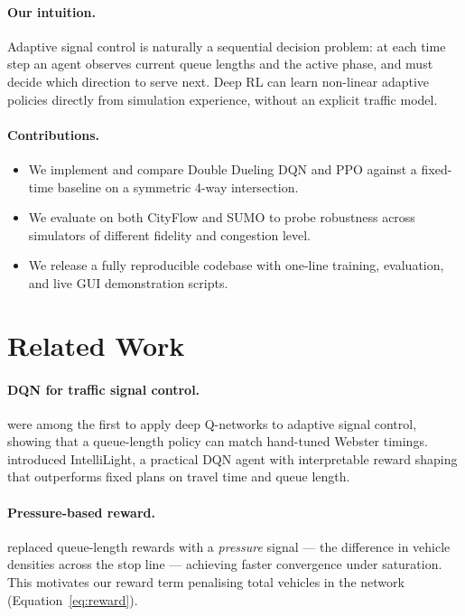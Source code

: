 \documentclass[10pt]{article}
\begin{document}
\paragraph{Our intuition.}
Adaptive signal control is naturally a sequential decision problem: at each
time step an agent observes current queue lengths and the active phase, and
must decide which direction to serve next.  Deep RL can learn non-linear
adaptive policies directly from simulation experience, without an explicit
traffic model.

\paragraph{Contributions.}
\begin{itemize}
  \item We implement and compare Double Dueling DQN and PPO against a
        fixed-time baseline on a symmetric 4-way intersection.
  \item We evaluate on both CityFlow and SUMO to probe robustness across
        simulators of different fidelity and congestion level.
  \item We release a fully reproducible codebase with one-line training,
        evaluation, and live GUI demonstration scripts.
\end{itemize}

\section{Related Work}

\paragraph{DQN for traffic signal control.}
\citet{li2016traffic} were among the first to apply deep Q-networks to adaptive
signal control, showing that a queue-length policy can match hand-tuned Webster
timings.  \citet{wei2018intellilight} introduced IntelliLight, a practical DQN
agent with interpretable reward shaping that outperforms fixed plans on travel
time and queue length.

\paragraph{Pressure-based reward.}
\citet{wei2019presslight} replaced queue-length rewards with a \emph{pressure}
signal — the difference in vehicle densities across the stop line — achieving
faster convergence under saturation.  This motivates our reward term penalising
total vehicles in the network (Equation~\ref{eq:reward}).
\end{document}
